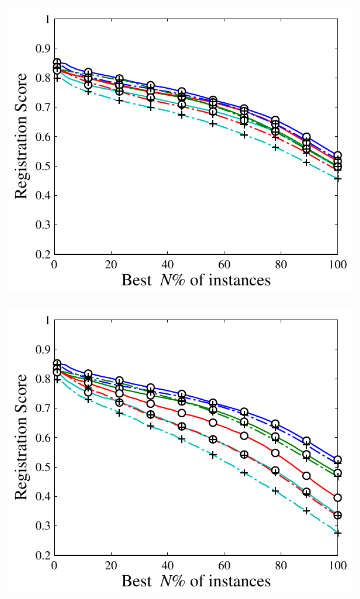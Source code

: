 \begin{figure}[ht]
	\centering 
	\begin{subfigure}[b]{0.48\linewidth}
		\includegraphics[width=\linewidth]{fig/reg/reg2d_simsim.pdf}
	\end{subfigure}
	\begin{subfigure}[b]{0.48\linewidth}
		\includegraphics[width=\linewidth]{fig/reg/reg2d_simaff.pdf}
	\end{subfigure}
	\begin{subfigure}[b]{0.48\linewidth}

\end{subfigure}
\end{figure}
